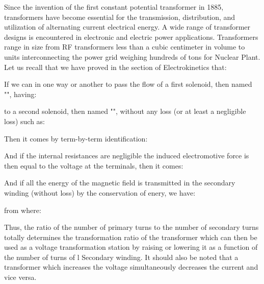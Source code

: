 	Since the invention of the first constant potential transformer in 1885, transformers have become essential for the transmission, distribution, and utilization of alternating current electrical energy. A wide range of transformer designs is encountered in electronic and electric power applications. Transformers range in size from RF transformers less than a cubic centimeter in volume to units interconnecting the power grid weighing hundreds of tons for Nuclear Plant.
	Let us recall that we have proved in the section of Electrokinetics that:
	
	If we can in one way or another to pass the flow of a first solenoid, then named "", having:
	
	to a second solenoid, then named "", without any loss (or at least a negligible loss) such as:
	
	Then it comes by term-by-term identification:
	
	And if the internal resistances are negligible the induced electromotive force is then equal to the voltage at the terminals, then it comes:
	
	And if all the energy of the magnetic field is transmitted in the secondary winding (without loss) by the conservation of enery, we have:
	
	from where:
	
	Thus, the ratio of the number of primary turns to the number of secondary turns totally determines the transformation ratio of the transformer which can then be used as a voltage transformation station by raising or lowering it as a function of the number of turns of l Secondary winding. It should also be noted that a transformer which increases the voltage simultaneously decreases the current and vice versa.

